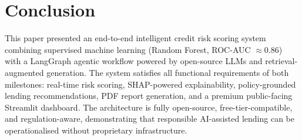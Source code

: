 \documentclass[11pt,a4paper]{article}
\begin{document}
\section{Conclusion}
\label{sec:conclusion}

This paper presented an end-to-end intelligent credit risk scoring system combining
supervised machine learning (Random Forest, ROC-AUC $\approx 0.86$) with a LangGraph
agentic workflow powered by open-source LLMs and retrieval-augmented generation. The
system satisfies all functional requirements of both milestones: real-time risk scoring,
SHAP-powered explainability, policy-grounded lending recommendations, PDF report
generation, and a premium public-facing Streamlit dashboard. The architecture is fully
open-source, free-tier-compatible, and regulation-aware, demonstrating that responsible
AI-assisted lending can be operationalised without proprietary infrastructure.
\end{document}
